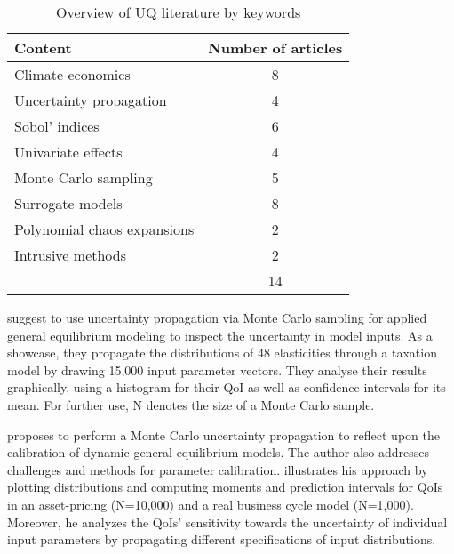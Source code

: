 \begin{table}[H]
	\centering
	\caption{Overview of UQ literature by keywords}
	\label{tab:lit}
	\renewcommand{\arraystretch}{1.2}%
	\begin{tabular}{lc}
		\toprule
		Content                     & \multicolumn{1}{l}{Number of articles} \\ \midrule
		\rowcolor[gray]{.9} 		Climate economics           &
		8 
		\\
		Uncertainty propagation     & 4                                    \\
		\rowcolor[gray]{.9} Sobol' indices              & 6                                    \\
		Univariate effects          & 4                                    \\
		\rowcolor[gray]{.9} Monte Carlo sampling                & 5                                    \\
		Surrogate models             & 8                                    \\
		\rowcolor[gray]{.9} Polynomial chaos expansions & 2                                    \\
		Intrusive methods            & 2                                    \\
		\midrule
		& 14                                   \\
		\bottomrule
	\end{tabular}
\end{table}

\cite{Harrison.1992} suggest to use uncertainty propagation via Monte Carlo sampling for applied general equilibrium modeling to inspect the uncertainty in model inputs. As a showcase, they propagate the distributions of 48 elasticities through a taxation model by drawing 15,000 input parameter vectors. They analyse their results graphically, using a histogram for their QoI as well as confidence intervals for its mean. For further use, N denotes the size of a Monte Carlo sample.

\cite{Canova.1994} proposes to perform a Monte Carlo uncertainty propagation to reflect upon the calibration of dynamic general equilibrium models. The author also addresses challenges and methods for parameter calibration. \citeauthor{Canova.1994} illustrates his approach by plotting distributions and computing moments and prediction intervals for QoIs in an asset-pricing (N=10,000) and a real business cycle model (N=1,000). Moreover, he analyzes the QoIs' sensitivity towards the uncertainty of individual input parameters by propagating different specifications of input distributions.

